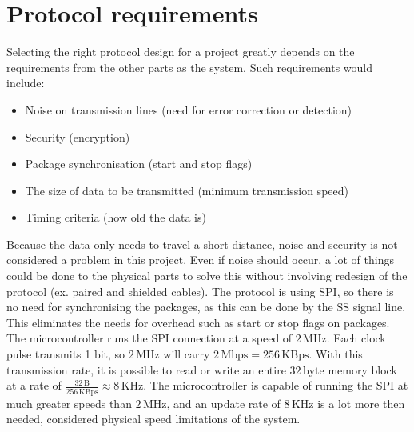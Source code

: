 
\section{Protocol requirements}
Selecting the right protocol design for a project greatly depends on the requirements from the other parts as the system. Such requirements would include: 
\begin{itemize}
\item Noise on transmission lines (need for error correction or detection)
\item Security (encryption)
\item Package synchronisation (start and stop flags)
\item The size of data to be transmitted (minimum transmission speed)
\item Timing criteria (how old the data is)%
\end{itemize}

Because the data only needs to travel a short distance, noise and security is not considered a problem in this project. Even if noise should occur, a lot of things could be done to the physical parts to solve this without involving redesign of the protocol (ex. paired and shielded cables). 
The protocol is using SPI, so there is no need for synchronising the packages, as this can be done by the SS signal line. This eliminates the needs for overhead such as start or stop flags on packages. 
The microcontroller runs the SPI connection at a speed of $2 \, \mathrm{MHz}$. Each clock pulse transmits 1 bit, so $2 \, \mathrm{MHz}$ will carry $2 \, \mathrm{Mbps} = 256 \, \mathrm{KBps}$. With this transmission rate, it is possible to read or write an entire $32 \, \mathrm{byte}$ memory block at a rate of $\frac{32 \, \mathrm{B}}{256 \, \mathrm{KBps}} \approx 8 \, \mathrm{KHz}$. The microcontroller is capable of running the SPI at much greater speeds than $2 \, \mathrm{MHz}$, and an update rate of $8\, \mathrm{KHz}$ is a lot more then needed, considered physical speed limitations of the system.


